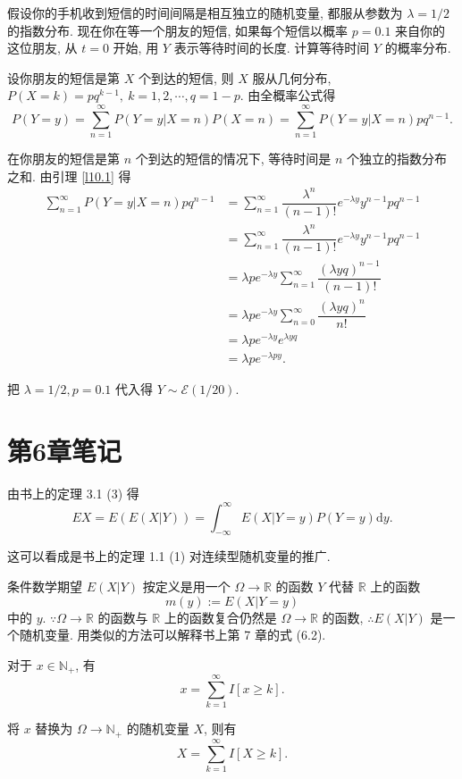 \documentclass[color=black,device=normal,lang=cn]{elegantnote}
\numberwithin{equation}{section}
\theoremstyle{plain}
\numberwithin{exercise}{exsection}
\begin{document}
\begin{exercise}[a]\label{ex5.36}
    假设你的手机收到短信的时间间隔是相互独立的随机变量, 都服从参数为 $\lambda=1/2$ 的指数分布. 现在你在等一个朋友的短信, 如果每个短信以概率 $p=0.1$ 来自你的这位朋友, 从 $t=0$ 开始, 用 $Y$ 表示等待时间的长度. 计算等待时间 $Y$ 的概率分布.
\end{exercise}
\begin{solution}
    设你朋友的短信是第 $X$ 个到达的短信, 则 $X$ 服从几何分布, $P(X=k)=pq^{k-1},\ k=1,2,\cdots,q=1-p$. 由全概率公式得
    \[P(Y=y)=\sum\limits_{n=1}^\infty P(Y=y|X=n)P(X=n)=\sum\limits_{n=1}^\infty P(Y=y|X=n)pq^{n-1}.\]

    在你朋友的短信是第 $n$ 个到达的短信的情况下, 等待时间是 $n$ 个独立的指数分布之和. 由引理 \ref{l10.1} 得
    \begin{align*}
        \sum\limits_{n=1}^\infty P(Y=y|X=n)pq^{n-1} & =\sum\limits_{n=1}^\infty\dfrac{\lambda^n}{(n-1)!}e^{-\lambda y}y^{n-1}pq^{n-1} \\
        & =\sum\limits_{n=1}^\infty\dfrac{\lambda^n}{(n-1)!}e^{-\lambda y}y^{n-1}pq^{n-1} \\
        & =\lambda pe^{-\lambda y}\sum\limits_{n=1}^\infty\dfrac{(\lambda yq)^{n-1}}{(n-1)!} \\
        & =\lambda pe^{-\lambda y}\sum\limits_{n=0}^\infty\dfrac{(\lambda yq)^n}{n!} \\
        & =\lambda pe^{-\lambda y}e^{\lambda yq} \\
        & =\lambda pe^{-\lambda py}.
    \end{align*}

    把 $\lambda=1/2,p=0.1$ 代入得 $Y\sim\mathcal{E}(1/20)$.
\end{solution}
\section{第6章笔记}
由书上的定理 3.1 (3) 得
\[EX=E(E(X|Y))=\int_{-\infty}^\infty E(X|Y=y)P(Y=y)\mathrm{d}y.\]

这可以看成是书上的定理 1.1 (1) 对连续型随机变量的推广.

条件数学期望 $E(X|Y)$ 按定义是用一个 $\Omega\to\mathbb{R}$ 的函数 $Y$ 代替 $\mathbb{R}$ 上的函数
\[m(y):=E(X|Y=y)\]
中的 $y$. $\because\Omega\to\mathbb{R}$ 的函数与 $\mathbb{R}$ 上的函数复合仍然是 $\Omega\to\mathbb{R}$ 的函数, $\therefore E(X|Y)$ 是一个随机变量. 用类似的方法可以解释书上第 7 章的式 (6.2).
\begin{example}
    对于 $x\in\mathbb{N}_+$, 有
    \[x=\sum\limits_{k=1}^\infty I[x\geq k].\]

    将 $x$ 替换为 $\Omega\to\mathbb{N}_+$ 的随机变量 $X$, 则有
    \[X=\sum\limits_{k=1}^\infty I[X\geq k].\]
\end{example}
\end{document}

